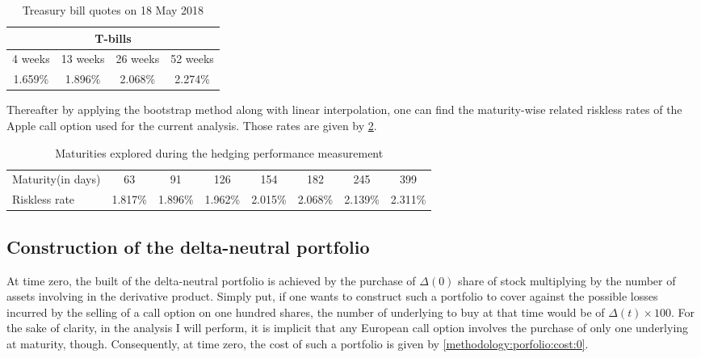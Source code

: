 \documentclass[12pt]{report}
\begin{document}
\begin{table}[h]
\centering
\begin{tabular}{cccc}
  \hline
  \multicolumn{4}{c}{T-bills} \\
  \hline
  4 weeks & 13 weeks & 26 weeks & 52 weeks \\
  1.659\% & 1.896\% & 2.068\% & 2.274\% \\
  \hline
\end{tabular}
\caption{Treasury bill quotes on 18 May 2018} 
\label{tab:methodology:Tbill:compound}
\end{table}

Thereafter by applying the bootstrap method along with linear interpolation, one can find the maturity-wise related riskless rates of the Apple call option used for the current analysis. Those rates are given by \cref{tab:methodology:tbill:maturity}.

\begin{table}[h]
\centering
\begin{tabular}{l|ccccccc}

  \hline
Maturity(in days) & 63   & 91   & 126  & 154    & 182  & 245    & 399 \\ 
Riskless rate     &  1.817\% & 1.896\% & 1.962\% & 2.015\%  & 2.068\%  & 2.139\%   & 2.311\% \\
   \hline
\end{tabular}
\caption{Maturities explored during the hedging performance measurement} 
\label{tab:methodology:tbill:maturity}
\end{table}




\subsection{Construction of the delta-neutral portfolio}
\label{sec:methodology:construction}

At time zero, the built of the delta-neutral portfolio is achieved by the purchase of $\Delta(0)$ share of stock multiplying by the number of assets involving in the derivative product.
Simply put, if one wants to construct such a portfolio to cover against the possible losses incurred by the selling of a call option on one hundred shares, the number of underlying to buy at that time would be of $\Delta(t) \times 100$.
For the sake of clarity, in the analysis I will perform, it is implicit that any European call option involves the purchase of only one underlying at maturity, though.
Consequently, at time zero, the cost of such a portfolio is given by \cref{methodology:porfolio:cost:0}.
\end{document}
